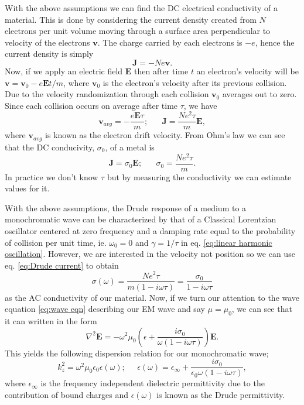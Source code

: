 With the above assumptions we can find the DC electrical conductivity of a material. This is done by considering the current density created from $N$ electrons per unit volume moving through a surface area perpendicular to velocity of the electrons $\mathbf{v}$. The charge carried by each electrons is $-e$, hence the current density is simply 
\begin{equation}
\mathbf{J}=-Ne\mathbf{v}.
\label{eq:Drude current}
\end{equation}
Now, if we apply an electric field $\mathbf{E}$ then after time $t$ an electron's velocity will be $\mathbf{v}=\mathbf{v}_0-e\mathbf{E}t/m$, where $\mathbf{v}_0$ is the electron's velocity after its previous collision. Due to the velocity randomization through each collision $\mathbf{v}_0$ averages out to zero. Since each collision occurs on average after time $\tau$, we have
\begin{equation}
\mathbf{v}_{avg}=-\frac{e\mathbf{E}\tau}{m}; \;\;\;\;\;\; \mathbf{J}=\frac{Ne^2\tau}{m}\mathbf{E},
\label{eq:Drude average}
\end{equation} 
where $\mathbf{v}_{avg}$ is known as the electron drift velocity. From Ohm's law we can see that the DC conducivity, $\sigma_0$, of a metal is
\begin{equation}
 \mathbf{J}=\sigma_0 \mathbf{E}; \;\;\;\;\;\; \sigma_0=\frac{Ne^2\tau}{m}.
\label{eq:Drude conductivity}
\end{equation}
In practice we don't know $\tau$ but by measuring the conductivity we can estimate values for it.


With the above assumptions, the Drude response of a medium to a monochromatic wave can be characterized by that of a Classical Lorentzian oscillator centered at zero frequency and a damping rate equal to the probability of collision per unit time, ie. $\omega_0=0$ and $\gamma=1/\tau$ in eq. \eqref{eq:linear harmonic oscillation}. However, we are interested in the velocity not position so we can use eq. \eqref{eq:Drude current} to obtain
\begin{equation}
\sigma(\omega)=\frac{Ne^2\tau}{m(1-i\omega\tau)}=\frac{\sigma_0}{1-i\omega\tau}
\label{eq:Drude AC conductivity}
\end{equation}
as the AC conductivity of our material. Now, if we turn our attention to the wave equation \eqref{eq:wave eqn} describing our EM wave and say $\mu=\mu_0$, we can see that it can written in the form 
\begin{equation}
\nabla^2 \mathbf{E}=-\omega^2 \mu_0\left(\epsilon+ \frac{i \sigma_0}{\omega(1-i\omega \tau)}\right)\mathbf{E}.
\label{eq:drude wave equation}
\end{equation}
This yields the following dispersion relation for our monochromatic wave; 
\begin{equation}
k_z^2=\omega^2\mu_0 \epsilon_0\epsilon(\omega); \;\;\;\;\; \epsilon(\omega)=\epsilon_{\infty}+\frac{i \sigma_0}{\epsilon_0\omega(1-i\omega \tau)},
\label{eq:drude dispersion}
\end{equation}
where $\epsilon_{\infty}$ is the frequency independent dielectric permittivity due to the contribution of bound charges and $\epsilon(\omega)$ is known as the Drude permittivity.

